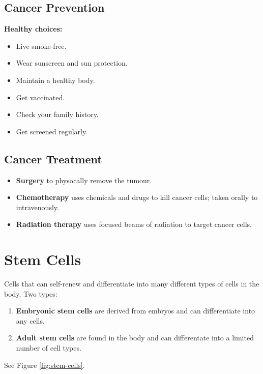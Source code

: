 \documentclass[12pt]{report}
\begin{document}
\newpage
\subsection{Cancer Prevention}
\textbf{Healthy choices:}
\begin{itemize}
    \item{Live smoke-free.}
    \item{Wear sunscreen and sun protection.}
    \item{Maintain a healthy body.}
    \item{Get vaccinated.}
    \item{Check your family history.}
    \item{Get screened regularly.}
\end{itemize}

\subsection{Cancer Treatment}
\begin{itemize}
    \item{ \textbf{Surgery} to physocally remove the tumour.}
    \item{ \textbf{Chemotherapy} uses chemicals and drugs to kill cancer cells; taken orally to intravenously.}
    \item{ \textbf{Radiation therapy} uses focused beams of radiation to target cancer cells.}
\end{itemize}

\section{Stem Cells}
\begin{definition}
    Cells that can self-renew and differentiate into many different types of cells in the body. Two types: 
    \begin{enumerate}
    \setlength\itemsep{0.5em}
        \item{\textbf{Embryonic stem cells} are derived from embryos and can differentiate into any cells.}
        \item{\textbf{Adult stem cells} are found in the body and can differentate into a limited number of cell types.}
    \end{enumerate}
    See Figure \ref{fig:stem-cells}.
\end{definition}
\end{document}

